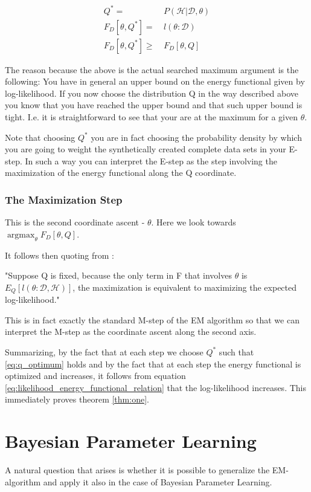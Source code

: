 \documentclass[11pt]{article}
\begin{document}
\begin{article}
\begin{align} \label{eq:q_optimum}
Q^* =& \ P (\mathscr{H}|\mathscr{D}, \theta) \\
F_D[\theta, Q^*] =& \ l (\theta: \mathscr{D}) \\
F_D[\theta, Q^*] \geq& \ F_D[\theta, Q]
\end{align}

The reason because the above is the actual searched maximum
argument is the following: You have in general an upper bound on
the energy functional given by log-likelihood. If you now choose
the distribution Q in the way described above you know that you
have reached the upper bound and that such upper bound is
tight. I.e. it is straightforward to see that your are at the
maximum for a given \(\theta\).

Note that choosing \(Q^*\) you are in fact choosing the probability
density by which you are going to weight the synthetically created
complete data sets in your E-step. In such a way you can interpret
the E-step as the step involving the maximization of the energy
functional along the Q coordinate.

\subsubsection{The Maximization Step}
\label{sec:org86288ff}

This is the second coordinate ascent - \(\theta\). Here we look
towards \(\operatorname*{argmax}_{\theta} F_D[\theta, Q]\).

It follows then quoting from
\cite{koller2009probabilistic}:

"Suppose Q is fixed, because the only term in F that involves \(\theta\) is
\(E_Q[l (\theta: \mathscr{D}, \mathscr{H})]\), the maximization is
equivalent to maximizing the expected log-likelihood."

This is in fact exactly the standard M-step of the EM algorithm so
that we can interpret the M-step as the coordinate ascent along
the second axis. 

Summarizing, by the fact that at each step we choose \(Q^*\) such
that \ref{eq:q_optimum} holds and by the fact that at each step the
energy functional is optimized and increases, it follows from
equation \ref{eq:likelihood_energy_functional_relation} that the
log-likelihood increases. This immediately proves theorem
\ref{thm:one}.

\newpage

\section{Bayesian Parameter Learning}
\label{bayes-parameter-learning}
A natural question that arises is whether it is possible to
generalize the EM-algorithm and apply it also in the case of
Bayesian Parameter Learning.


\end{article}
\end{document}
